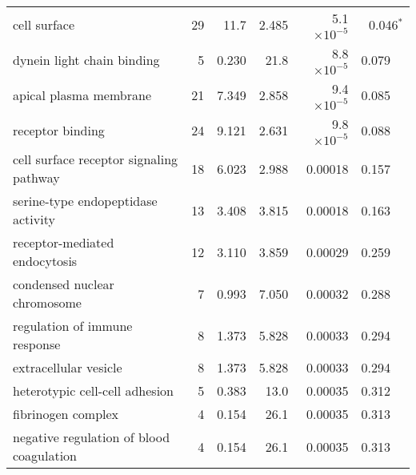 \begin{longtable}{|l|r|r|r|r|r|}
                                      cell surface &                      29 &                    11.7 &      2.485 &  5.1$\times 10^{-5}$ &                0.046$\bm{^*}$ \\
                        dynein light chain binding &                       5 &                   0.230 &       21.8 &  8.8$\times 10^{-5}$ &                       0.079~~ \\
                            apical plasma membrane &                      21 &                   7.349 &      2.858 &  9.4$\times 10^{-5}$ &                       0.085~~ \\
                                  receptor binding &                      24 &                   9.121 &      2.631 &  9.8$\times 10^{-5}$ &                       0.088~~ \\
           cell surface receptor signaling pathway &                      18 &                   6.023 &      2.988 &              0.00018 &                       0.157~~ \\
                serine-type endopeptidase activity &                      13 &                   3.408 &      3.815 &              0.00018 &                       0.163~~ \\
                     receptor-mediated endocytosis &                      12 &                   3.110 &      3.859 &              0.00029 &                       0.259~~ \\
                      condensed nuclear chromosome &                       7 &                   0.993 &      7.050 &              0.00032 &                       0.288~~ \\
                     regulation of immune response &                       8 &                   1.373 &      5.828 &              0.00033 &                       0.294~~ \\
                             extracellular vesicle &                       8 &                   1.373 &      5.828 &              0.00033 &                       0.294~~ \\
                    heterotypic cell-cell adhesion &                       5 &                   0.383 &       13.0 &              0.00035 &                       0.312~~ \\
                                fibrinogen complex &                       4 &                   0.154 &       26.1 &              0.00035 &                       0.313~~ \\
          negative regulation of blood coagulation &                       4 &                   0.154 &       26.1 &              0.00035 &                       0.313~~ \\

\end{longtable}
